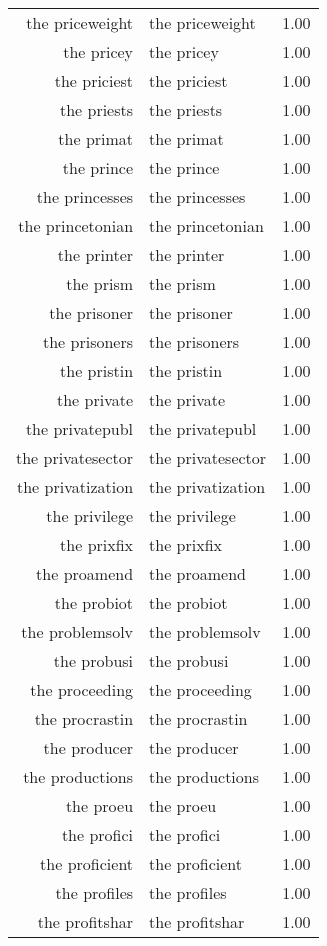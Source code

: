 \begin{table}[ht]
\begin{tabular}{rlr}
  the priceweight & the priceweight & 1.00 \\ 
  the pricey & the pricey & 1.00 \\ 
  the priciest & the priciest & 1.00 \\ 
  the priests & the priests & 1.00 \\ 
  the primat & the primat & 1.00 \\ 
  the prince & the prince & 1.00 \\ 
  the princesses & the princesses & 1.00 \\ 
  the princetonian & the princetonian & 1.00 \\ 
  the printer & the printer & 1.00 \\ 
  the prism & the prism & 1.00 \\ 
  the prisoner & the prisoner & 1.00 \\ 
  the prisoners & the prisoners & 1.00 \\ 
  the pristin & the pristin & 1.00 \\ 
  the private & the private & 1.00 \\ 
  the privatepubl & the privatepubl & 1.00 \\ 
  the privatesector & the privatesector & 1.00 \\ 
  the privatization & the privatization & 1.00 \\ 
  the privilege & the privilege & 1.00 \\ 
  the prixfix & the prixfix & 1.00 \\ 
  the proamend & the proamend & 1.00 \\ 
  the probiot & the probiot & 1.00 \\ 
  the problemsolv & the problemsolv & 1.00 \\ 
  the probusi & the probusi & 1.00 \\ 
  the proceeding & the proceeding & 1.00 \\ 
  the procrastin & the procrastin & 1.00 \\ 
  the producer & the producer & 1.00 \\ 
  the productions & the productions & 1.00 \\ 
  the proeu & the proeu & 1.00 \\ 
  the profici & the profici & 1.00 \\ 
  the proficient & the proficient & 1.00 \\ 
  the profiles & the profiles & 1.00 \\ 
  the profitshar & the profitshar & 1.00 \\ 

\end{tabular}
\end{table}

